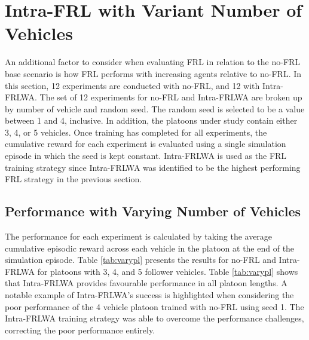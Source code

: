 \section{Intra-FRL with Variant Number of Vehicles}
An additional factor to consider when evaluating FRL in relation to the no-FRL base scenario is how FRL performs with increasing agents relative to no-FRL.  In this section, 12 experiments are conducted with no-FRL, and 12 with Intra-FRLWA. The set of 12 experiments for no-FRL and Intra-FRLWA are broken up by number of vehicle and random seed.  The random seed is selected to be a value between 1 and 4, inclusive. In addition, the platoons under study contain either 3, 4, or 5 vehicles. Once training has completed for all experiments, the cumulative reward for each experiment is evaluated using a single simulation episode in which the seed is kept constant.  Intra-FRLWA is used as the FRL training strategy since Intra-FRLWA was identified to be the highest performing FRL strategy in the previous section. 

\subsection{Performance with Varying Number of Vehicles}
The performance for each experiment is calculated by taking the average cumulative episodic reward across each vehicle in the platoon at the end of the simulation episode.  Table \ref{tab:varypl} presents the results for no-FRL and Intra-FRLWA for platoons with 3, 4, and 5 follower vehicles. Table \ref{tab:varypl} shows that Intra-FRLWA provides favourable performance in all platoon lengths. A notable example of Intra-FRLWA's success is highlighted when considering the poor performance of the 4 vehicle platoon trained with no-FRL using seed 1. The Intra-FRLWA training strategy was able to overcome the performance challenges, correcting the poor performance entirely.

